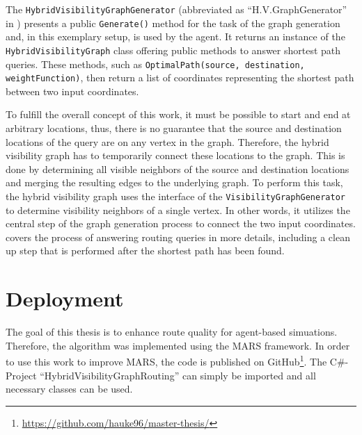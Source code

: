 	The \texttt{HybridVisibilityGraphGenerator} (abbreviated as \enquote{H.V.GraphGenerator} in ) presents a public \texttt{Generate()} method for the task of the graph generation and, in this exemplary setup, is used by the agent.
	It returns an instance of the \texttt{HybridVisibilityGraph} class offering public methods to answer shortest path queries.
	These methods, such as \texttt{OptimalPath(source, destination, weightFunction)}, then return a list of coordinates representing the shortest path between two input coordinates.
	
	To fulfill the overall concept of this work, it must be possible to start and end at arbitrary locations, thus, there is no guarantee that the source and destination locations of the query are on any vertex in the graph.
	Therefore, the hybrid visibility graph has to temporarily connect these locations to the graph.
	This is done by determining all visible neighbors of the source and destination locations and merging the resulting edges to the underlying graph.
	To perform this task, the hybrid visibility graph uses the interface of the \texttt{VisibilityGraphGenerator} to determine visibility neighbors of a single vertex.
	In other words, it utilizes the central step of the graph generation process to connect the two input coordinates.
	 covers the process of answering routing queries in more details, including a clean up step that is performed after the shortest path has been found.

\section{Deployment}

	The goal of this thesis is to enhance route quality for agent-based simuations.
	Therefore, the algorithm was implemented using the MARS framework.
	In order to use this work to improve MARS, the code is published on GitHub\footnote{\url{https://github.com/hauke96/master-thesis/}}.
	The C\#-Project \enquote{HybridVisibilityGraphRouting} can simply be imported and all necessary classes can be used.